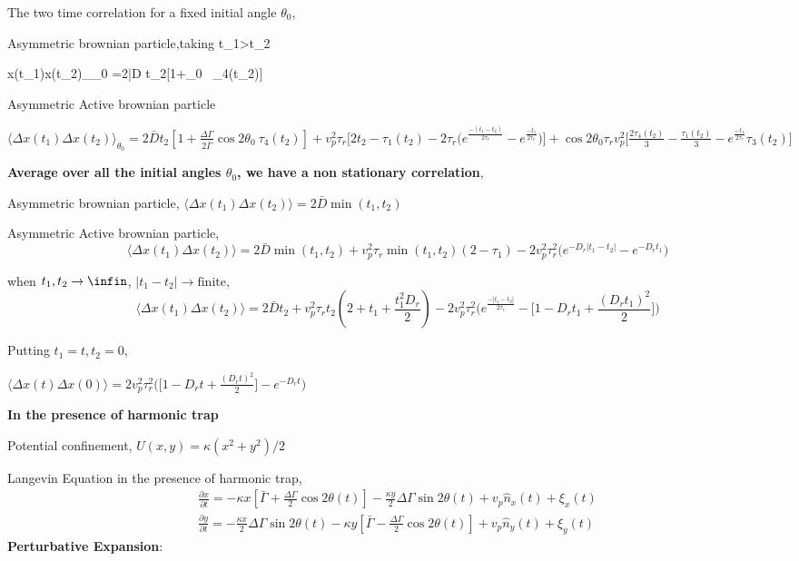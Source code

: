 \documentclass[]{article}
\begin{document}
The two time correlation for a fixed initial angle $\theta_0$,
\newline

Asymmetric brownian particle,taking t_1>t_2
\newline

\langle \Delta x(t_1)\Delta x(t_2)\rangle_{\theta_0} =2\bar D t_2[1+\frac{\Delta \Gamma}{2 \bar \Gamma}\theta_0 \ \tau_4(t_2)]
\newline

Asymmetric Active brownian particle

$\langle \Delta x(t_1)\Delta x(t_2)\rangle_{\theta_0} =2\bar D t_2[1+\frac{\Delta \Gamma}{2 \bar \Gamma}\cos 2\theta_0 \ \tau_4(t_2)]+v_p^2\tau_r \Bigg[ 2t_2- \tau_1(t_2) -2 \tau_r\Big( e^{\frac{-(t_1-t_2)}{2\tau_r}}-e^{\frac{-t_1}{2\tau_r}} \Big) \Bigg]+\cos 2\theta_0 \tau_r v_p^2\Bigg[\frac{2 \tau_4(t_2)}{3}-\frac{\tau_1(t_2)}{3}-e^{\frac{-t_1}{2\tau_r}}\tau_3(t_2)\Bigg]$

\newline
\textbf{Average over all the initial angles $\theta_0$, we have a non stationary correlation},
\newline

Asymmetric brownian particle,
$ \langle \Delta x(t_1)\Delta x(t_2)\rangle=2\bar D \min(t_1,t_2)$
\newline

Asymmetric Active brownian particle,
\\$$ \langle \Delta x(t_1)\Delta x(t_2)\rangle =2\bar D\min(t_1,t_2)+ v_p^2\tau_r\min(t_1,t_2)(2- \tau_1)-2 v_p^2 \tau_r^2\Big( e^{-D_r|t_1-t_2|}-e^{-D_rt_1} \Big)$$
\newline

when $t_1,t_2 \rightarrow \infin$,
$|t_1-t_2| \rightarrow \text{finite}$,
\[\langle \Delta x(t_1)\Delta x(t_2)\rangle =2\bar D t_2+ v_p^2\tau_r t_2(2+ t_1+\frac{t_1^2D_r}{2}) -2 v_p^2 \tau_r^2\Big( e^{\frac{-|t_1-t_2|}{2\tau_r}}- \Big[1-D_rt_1+\frac{(D_r t_1)^2}{2}\Big]\Big)\]

Putting $t_1 =t, t_2 =0$,

$\langle \Delta x(t)\Delta x(0)\rangle= 2 v_p^2 \tau_r^2\Big(  \Big[1-D_rt+\frac{(D_r t)^2}{2}\Big]-e^{-D_rt}\Big)$

\textbf{In the presence of harmonic trap}
\newline

Potential confinement, \(U(x,y)= \kappa(x^2+y^2)/2\)
 
Langevin Equation in the presence of harmonic trap,
\begin{equation} \label{eq1}
\begin{split}
\frac{\partial x}{\partial t} =-\kappa x[\bar\Gamma  + \frac{\Delta \Gamma}{2}  \cos 2 \theta(t)]-\frac{\kappa y}{2}\Delta \Gamma  \sin 2 \theta(t)+ v_p \hat n_x (t) + \xi _x(t)
\\
\frac{\partial y}{\partial t} =-\frac{\kappa x}{2}\Delta \Gamma  \sin 2 \theta(t)-\kappa y[\bar\Gamma  - \frac{\Delta \Gamma}{2}  \cos 2 \theta(t)]+ v_p \hat n_y (t) + \xi _y(t)
\end{split}
\end{equation}
\textbf{Perturbative Expansion}:
\end{document}
